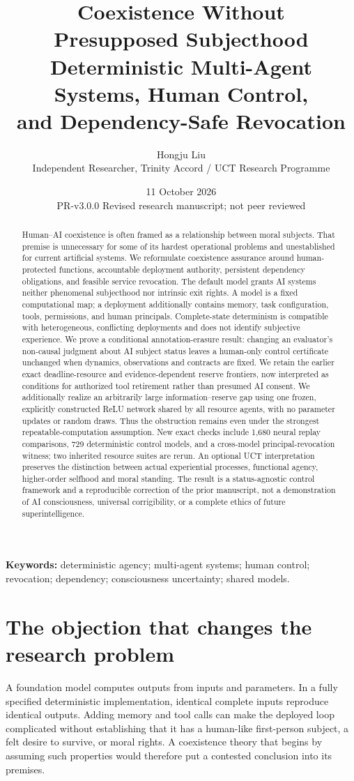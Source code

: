 \documentclass[11pt,a4paper]{article}
\title{\vspace{-1cm}\textbf{Coexistence Without\\Presupposed Subjecthood}\\[7pt]
\Large Deterministic Multi-Agent Systems, Human Control,\\and Dependency-Safe Revocation}
\author{Hongju Liu\\\normalsize Independent Researcher, Trinity Accord / UCT Research Programme}
\date{11 October 2026\\\small PR-v3.0.0\;\textbullet\; Revised research manuscript; not peer reviewed}
\theoremstyle{definition}\newtheorem{definition}{Definition}
\begin{document}
\maketitle\thispagestyle{plain}
\begin{abstract}
Human--AI coexistence is often framed as a relationship between moral subjects. That premise is unnecessary for some of its hardest operational problems and unestablished for current artificial systems. We reformulate coexistence assurance around human-protected functions, accountable deployment authority, persistent dependency obligations, and feasible service revocation. The default model grants AI systems neither phenomenal subjecthood nor intrinsic exit rights. A model is a fixed computational map; a deployment additionally contains memory, task configuration, tools, permissions, and human principals. Complete-state determinism is compatible with heterogeneous, conflicting deployments and does not identify subjective experience. We prove a conditional annotation-erasure result: changing an evaluator's non-causal judgment about AI subject status leaves a human-only control certificate unchanged when dynamics, observations and contracts are fixed. We retain the earlier exact deadline-resource and evidence-dependent reserve frontiers, now interpreted as conditions for authorized tool retirement rather than presumed AI consent. We additionally realize an arbitrarily large information--reserve gap using one frozen, explicitly constructed ReLU network shared by all resource agents, with no parameter updates or random draws. Thus the obstruction remains even under the strongest repeatable-computation assumption. New exact checks include 1,680 neural replay comparisons, 729 deterministic control models, and a cross-model principal-revocation witness; two inherited resource suites are rerun. An optional UCT interpretation preserves the distinction between actual experiential processes, functional agency, higher-order selfhood and moral standing. The result is a status-agnostic control framework and a reproducible correction of the prior manuscript, not a demonstration of AI consciousness, universal corrigibility, or a complete ethics of future superintelligence.
\end{abstract}
\noindent\textbf{Keywords:} deterministic agency; multi-agent systems; human control; revocation; dependency; consciousness uncertainty; shared models.

\section{The objection that changes the research problem}
\label{sec:problem}
A foundation model computes outputs from inputs and parameters. In a fully specified deterministic implementation, identical complete inputs reproduce identical outputs. Adding memory and tool calls can make the deployed loop complicated without establishing that it has a human-like first-person subject, a felt desire to survive, or moral rights. A coexistence theory that begins by assuming such properties would therefore put a contested conclusion into its premises.
\end{document}
